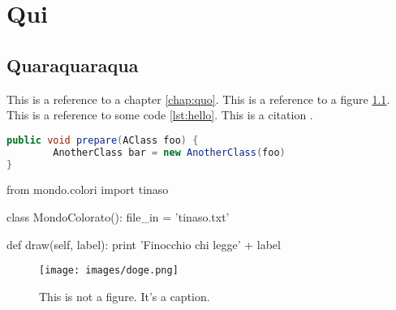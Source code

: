 \chapter{Qui}
\label{chap:qui}

\section{Quaraquaraqua}
\label{sec:quaqaraqua}

This is a reference to a chapter \ref{chap:quo}. This is a reference to a figure \ref{fig:doge}. This is a reference to some code \ref{lst:hello}. This is a citation \cite{famous:paper}.



\begin{lstlisting}[language=Java, label=lst:java, caption={Some code in another language than the default one}]
public void prepare(AClass foo) {
        AnotherClass bar = new AnotherClass(foo)
}
\end{lstlisting}


\begin{python}[caption={Finally coloured Python}]
from mondo.colori import tinaso

class MondoColorato():
    file_in = 'tinaso.txt'
    
    def draw(self, label):
       print 'Finocchio chi legge' + label

\end{python}


\Blindtext

\begin{figure}
\begin{center}
\texttt{[image: images/doge.png]}
\end{center}
\caption{This is not a figure. It's a caption.}
\label{fig:doge}
\end{figure}